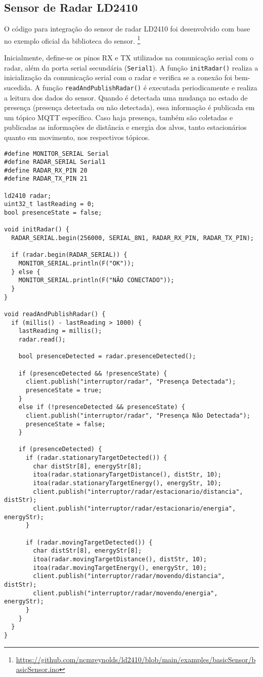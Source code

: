\documentclass[]{abntex2}
\begin{document}
\subsection{Sensor de Radar LD2410}

O código para integração do sensor de radar LD2410 foi desenvolvido com base no
exemplo oficial da biblioteca do sensor.
\footnote{\url{https://github.com/ncmreynolds/ld2410/blob/main/examples/basicSensor/basicSensor.ino}}

Inicialmente, define-se os pinos RX e TX utilizados na comunicação serial com o
radar, além da porta serial secundária (\texttt{Serial1}). A função
\texttt{initRadar()} realiza a inicialização da comunicação serial com o radar e
verifica se a conexão foi bem-sucedida. A função \texttt{readAndPublishRadar()}
é executada periodicamente e realiza a leitura dos dados do sensor. Quando é
detectada uma mudança no estado de presença (presença detectada ou não
detectada), essa informação é publicada em um tópico MQTT específico. Caso haja
presença, também são coletadas e publicadas as informações de distância e
energia dos alvos, tanto estacionários quanto em movimento, nos respectivos
tópicos.
\clearpage
\begin{verbatim}
#define MONITOR_SERIAL Serial
#define RADAR_SERIAL Serial1
#define RADAR_RX_PIN 20
#define RADAR_TX_PIN 21

ld2410 radar;
uint32_t lastReading = 0;
bool presenceState = false;

void initRadar() {
  RADAR_SERIAL.begin(256000, SERIAL_8N1, RADAR_RX_PIN, RADAR_TX_PIN);

  if (radar.begin(RADAR_SERIAL)) {
    MONITOR_SERIAL.println(F("OK"));
  } else {
    MONITOR_SERIAL.println(F("NÃO CONECTADO"));
  }
}

void readAndPublishRadar() {
  if (millis() - lastReading > 1000) {
    lastReading = millis();
    radar.read();

    bool presenceDetected = radar.presenceDetected();

    if (presenceDetected && !presenceState) {
      client.publish("interruptor/radar", "Presença Detectada");
      presenceState = true;
    }
    else if (!presenceDetected && presenceState) {
      client.publish("interruptor/radar", "Presença Não Detectada");
      presenceState = false;
    }

    if (presenceDetected) {
      if (radar.stationaryTargetDetected()) {
        char distStr[8], energyStr[8];
        itoa(radar.stationaryTargetDistance(), distStr, 10);
        itoa(radar.stationaryTargetEnergy(), energyStr, 10);
        client.publish("interruptor/radar/estacionario/distancia", distStr);
        client.publish("interruptor/radar/estacionario/energia", energyStr);
      }

      if (radar.movingTargetDetected()) {
        char distStr[8], energyStr[8];
        itoa(radar.movingTargetDistance(), distStr, 10);
        itoa(radar.movingTargetEnergy(), energyStr, 10);
        client.publish("interruptor/radar/movendo/distancia", distStr);
        client.publish("interruptor/radar/movendo/energia", energyStr);
      }
    }
  }
}
\end{verbatim}
\end{document}
